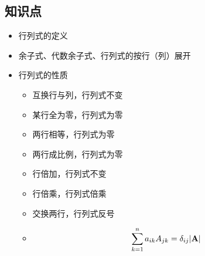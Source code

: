 \subsection{知识点}

\begin{frame}
  \begin{footnotesize}
    \begin{itemize}
    \item 行列式的定义
    \item[] 余子式、代数余子式、行列式的按行（列）展开
    \end{itemize}
  \end{footnotesize}
\end{frame}


\begin{frame}
  \begin{footnotesize}
    \begin{itemize}
    \item 行列式的性质
      \begin{itemize}
      \item 互换行与列，行列式不变
      \item 某行全为零，行列式为零
      \item 两行相等，行列式为零
      \item 两行成比例，行列式为零
      \item 行倍加，行列式不变
      \item 行倍乘，行列式倍乘
      \item 交换两行，行列式反号
      \item
        $$
        \sum_{k=1}^n a_{ik}A_{jk}=\delta_{ij}|\mathbf{A}|
        $$
      \end{itemize}
    \end{itemize}
  \end{footnotesize}
\end{frame}


